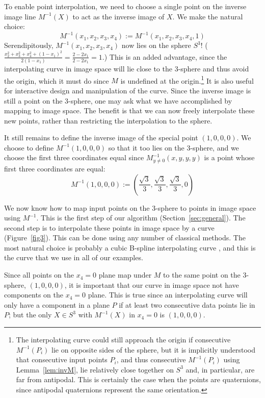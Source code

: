 To enable point interpolation, we need to
choose a single point on the inverse image
line $M^{-1}(X)$ to act as the inverse image of $X$.
We make the natural choice:
\[
M^{-1} (x_1,x_2,x_3,x_4) := M^{-1} (x_1,x_2,x_3,x_4,1) 
\]
Serendipitously,  
$M^{-1} (x_1,x_2,x_3,x_4)$ now lies on the sphere $S^3$!
($\frac{x_2^2+x_3^2+x_4^2 + (1-x_1)^2}{2(1-x_1)} = \frac{2-2x_1}{2-2x_1} = 1$.)
This is an added advantage,
since the interpolating curve in image space will lie close
to the 3-sphere and thus avoid the origin,
which it must do since $M$ is undefined at the origin.\footnote{The 
	interpolating curve could still approach the origin if
	consecutive $M^{-1}(P_i)$ lie on opposite sides of the sphere,
	but it is implicitly understood that consecutive input points $P_i$,
	and thus consecutive $M^{-1}(P_i)$ using Lemma~\ref{lem:invM},
	lie relatively close together on $S^3$ and, in particular, 
	are far from antipodal.
	This is certainly the case when the points are
	quaternions, since antipodal quaternions represent the same
	orientation.}
It is also useful for interactive design and manipulation of the curve.
Since the inverse image is still a point on the 3-sphere,
one may ask what we have accomplished by mapping to image space.
The benefit is that we can now freely interpolate these new points,
rather than restricting the interpolation to the sphere.

It still remains to define the inverse image of the special point $(1,0,0,0)$.
We choose to define $M^{-1}(1,0,0,0)$ so that it too lies on the 3-sphere,
and we choose the first three coordinates equal since $M^{-1}_{y \neq 0}(x,y,y,y)$
is a point whose first three coordinates are equal:
\[ M^{-1}(1,0,0,0) := (\frac{\sqrt{3}}{3},\frac{\sqrt{3}}{3},\frac{\sqrt{3}}{3}, 0)
\]

We now know how to map input points on the 3-sphere to points in 
image space using $M^{-1}$.
This is the first step of our algorithm (Section~\ref{sec:general}).
The second step is to interpolate these points in image space by a curve
(Figure~\ref{fig3}).
This can be done using any number of classical methods.
The most natural choice is probably a cubic B-spline interpolating curve \cite{farin93},
and this is the curve that we use in all of our examples.

\begin{rmk}
\label{rmk:1000}
Since all points on the $x_4=0$ plane map under $M$ to the same point
on the 3-sphere, $(1,0,0,0)$, it is important that our curve in image space
not have components on the $x_4=0$ plane.
This is true since an interpolating curve will only have a component in a plane
$P$ if at least two consecutive data points lie in $P$;
but the only $X \in S^3$ with $M^{-1}(X)$ in $x_4=0$ is $(1,0,0,0)$.
\end{rmk}

